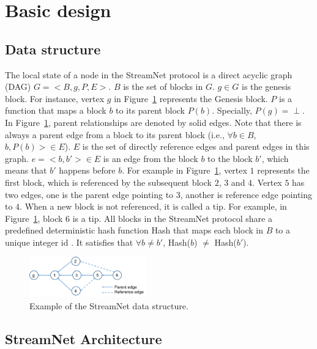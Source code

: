 \section{Basic design}


\subsection{Data structure}

The local state of a node in the StreamNet protocol is a direct acyclic graph (DAG) $G = <B,g,P,E>$. 
$B$ is the set of blocks in $G$. 
$g \in G$ is the genesis block. 
For instance, vertex $g$ in Figure~\ref{simple_sn} represents the Genesis block.
$P$ is a function that maps a block $b$ to its parent block $P(b)$. Specially, $P(g) = \perp$. 
In Figure~\ref{simple_sn}, parent relationships are denoted by solid edges.
Note that there is always a parent edge from a block to its parent block (i.e., $\forall b \in B$, $b, P(b)> \in E$). 
$E$ is the set of directly reference edges and parent edges in this graph. 
$e = <b,b'> \in E$ is an edge from the block $b$ to the block $b'$, 
which means that $b'$ happens before $b$. 
For example in Figure~\ref{simple_sn}, vertex $1$ represents the first block, which is referenced by the subsequent block $2$, $3$ and $4$. 
Vertex $5$ has two edges, one is the parent edge pointing to $3$, another is reference edge pointing to $4$.
When a new block is not referenced, it is called a tip. For example, in Figure~\ref{simple_sn}, block $6$ is a tip.
All blocks in the StreamNet protocol share a predefined deterministic 
hash function Hash that maps each block in $B$ to a unique integer id . 
It satisfies that $\forall {b} \neq {b'}$, Hash($b$) $\neq$ Hash($b'$).

\begin{figure}[!ht]
\begin{center}
\includegraphics[width=0.45\textwidth]{figures/simple_sn.pdf}
    \caption{
        Example of the StreamNet data structure.
     }
\label{simple_sn}
\end{center}
\end{figure}

\subsection{StreamNet Architecture}

